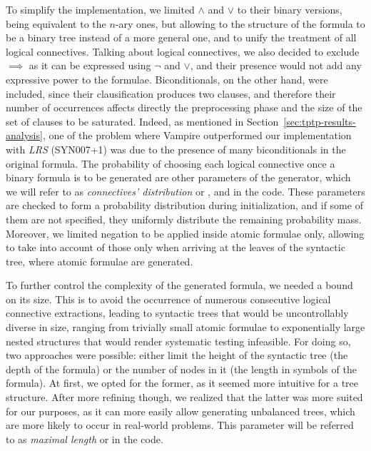 To simplify the implementation, we limited \(\land\) and \(\lor\) to their binary versions, being equivalent to the \(n\)-ary ones, but allowing to the structure of the formula to be a binary tree instead of a more general one, and to unify the treatment of all logical connectives.
Talking about logical connectives, we also decided to exclude \(\implies\) as it can be expressed using \(\lnot\) and \(\lor\), and their presence would not add any expressive power to the formulae.
Biconditionals, on the other hand, were included, since their clausification produces two clauses, and therefore their number of occurrences affects directly the preprocessing phase and the size of the set of clauses to be saturated.
Indeed, as mentioned in Section~\ref{sec:tptp-results-analysis}, one of the problem where Vampire outperformed our implementation with \emph{LRS} (SYN007+1) was due to the presence of many biconditionals in the original formula.
The probability of choosing each logical connective once a binary formula is to be generated are other parameters of the generator, which we will refer to as \emph{connectives' distribution} or ,  and  in the code.
These parameters are checked to form a probability distribution during initialization, and if some of them are not specified, they uniformly distribute the remaining probability mass.
Moreover, we limited negation to be applied inside atomic formulae only, allowing to take into account of those only when arriving at the leaves of the syntactic tree, where atomic formulae are generated.

To further control the complexity of the generated formula, we needed a bound on its size.
This is to avoid the occurrence of numerous consecutive logical connective extractions, leading to syntactic trees that would be uncontrollably diverse in size, ranging from trivially small atomic formulae to exponentially large nested structures that would render systematic testing infeasible.
For doing so, two approaches were possible: either limit the height of the syntactic tree (the depth of the formula) or the number of nodes in it (the length in symbols of the formula).
At first, we opted for the former, as it seemed more intuitive for a tree structure. After more refining though, we realized that the latter was more suited for our purposes, as it can more easily allow generating unbalanced trees, which are more likely to occur in real-world problems.
This parameter will be referred to as \emph{maximal length} or  in the code.

